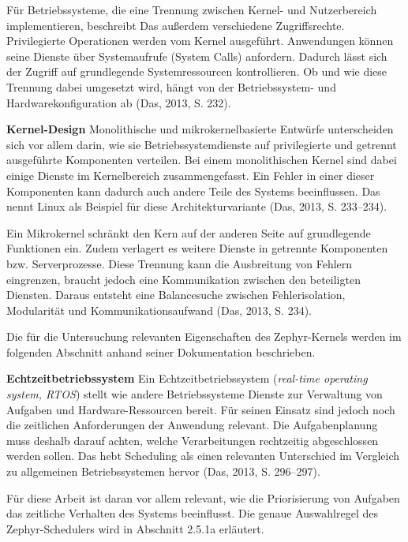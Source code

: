Für Betriebssysteme, die eine Trennung zwischen Kernel- und Nutzerbereich implementieren, beschreibt Das außerdem verschiedene Zugriffsrechte. Privilegierte Operationen werden vom Kernel ausgeführt. Anwendungen können seine Dienste über Systemaufrufe (System Calls) anfordern. Dadurch lässt sich der Zugriff auf grundlegende Systemressourcen kontrollieren. Ob und wie diese Trennung dabei umgesetzt wird, hängt von der Betriebssystem- und Hardwarekonfiguration ab (Das, 2013, S. 232).

\textbf{Kernel-Design }Monolithische und mikrokernelbasierte Entwürfe unterscheiden sich vor allem darin, wie sie Betriebssystemdienste auf privilegierte und getrennt ausgeführte Komponenten verteilen. Bei einem monolithischen Kernel sind dabei einige Dienste im Kernelbereich zusammengefasst. Ein Fehler in einer dieser Komponenten kann dadurch auch andere Teile des Systems beeinflussen. Das nennt Linux als Beispiel für diese Architekturvariante (Das, 2013, S. 233–234).

Ein Mikrokernel schränkt den Kern auf der anderen Seite auf grundlegende Funktionen ein. Zudem verlagert es weitere Dienste in getrennte Komponenten bzw. Serverprozesse. Diese Trennung kann die Ausbreitung von Fehlern eingrenzen, braucht jedoch eine Kommunikation zwischen den beteiligten Diensten. Daraus entsteht eine Balancesuche zwischen Fehlerisolation, Modularität und Kommunikationsaufwand (Das, 2013, S. 234).

Die für die Untersuchung relevanten Eigenschaften des Zephyr-Kernels werden im folgenden Abschnitt anhand seiner Dokumentation beschrieben.

\textbf{Echtzeitbetriebssystem} Ein Echtzeitbetriebssystem (\emph{real-time operating system, RTOS}) stellt wie andere Betriebssysteme Dienste zur Verwaltung von Aufgaben und Hardware-Ressourcen bereit. Für seinen Einsatz sind jedoch noch die zeitlichen Anforderungen der Anwendung relevant. Die Aufgabenplanung muss deshalb darauf achten, welche Verarbeitungen rechtzeitig abgeschlossen werden sollen. Das hebt Scheduling als einen relevanten Unterschied im Vergleich zu allgemeinen Betriebssystemen hervor (Das, 2013, S. 296–297).

Für diese Arbeit ist daran vor allem relevant, wie die Priorisierung von Aufgaben das zeitliche Verhalten des Systems beeinflusst. Die genaue Auswahlregel des Zephyr-Schedulers wird in Abschnitt 2.5.1a erläutert.

